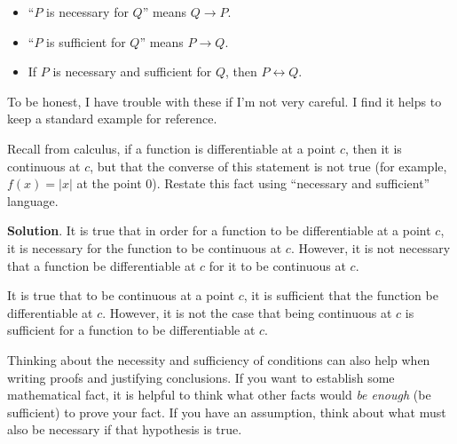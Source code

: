 \documentclass[11pt,]{book}
\theoremstyle{ptxplainnotitle}
\theoremstyle{ptxplaintitle}
\theoremstyle{ptxdefinitionnotitle}
\theoremstyle{ptxdefinitiontitle}
\theoremstyle{ptxdefinitionnotitle}
\theoremstyle{ptxdefinitiontitle}
\theoremstyle{ptxdefinitionnotitle}
\theoremstyle{ptxdefinitiontitle}
\theoremstyle{ptxdefinitiontitlenonumber}
\theoremstyle{ptxdefinitiontitlenonumber}
\numberwithin{equation}{chapter}
\renewcommand{\iff}{\leftrightarrow}
\newcommand{\imp}{\rightarrow}
\begin{document}
\begin{assemblage}\label{assemblage-31}
\hypertarget{p-1878}{}%
\par
\hypertarget{p-1879}{}%
%
\begin{itemize}[label=\textbullet]
\item{}``\(P\) is necessary for \(Q\)'' means \(Q \imp P\).%
\item{}``\(P\) is sufficient for \(Q\)'' means \(P \imp Q\).%
\item{}\hypertarget{p-1880}{}%
If \(P\) is necessary and sufficient for \(Q\), then \(P \iff Q\).%
\end{itemize}
%
\end{assemblage}
\hypertarget{p-1881}{}%
To be honest, I have trouble with these if I'm not very careful. I find it helps to keep a standard example for reference.%
\begin{example}\label{example-55}
\hypertarget{p-1882}{}%
Recall from calculus, if a function is differentiable at a point \(c\), then it is continuous at \(c\), but that the converse of this statement is not true (for example, \(f(x) = |x|\) at the point 0). Restate this fact using ``necessary and sufficient'' language.%
\par\smallskip%
\noindent\textbf{Solution}.\hypertarget{solution-236}{}\quad%
\hypertarget{p-1883}{}%
It is true that in order for a function to be differentiable at a point \(c\), it is necessary for the function to be continuous at \(c\). However, it is not necessary that a function be differentiable at \(c\) for it to be continuous at \(c\).%
\par
\hypertarget{p-1884}{}%
It is true that to be continuous at a point \(c\), it is sufficient that the function be differentiable at \(c\). However, it is not the case that being continuous at \(c\) is sufficient for a function to be differentiable at \(c\).%
\end{example}
\hypertarget{p-1885}{}%
Thinking about the necessity and sufficiency of conditions can also help when writing proofs and justifying conclusions. If you want to establish some mathematical fact, it is helpful to think what other facts would \emph{be enough} (be sufficient) to prove your fact. If you have an assumption, think about what must also be necessary if that hypothesis is true.%
\typeout{************************************************}
\typeout{************************************************}
\end{document}
